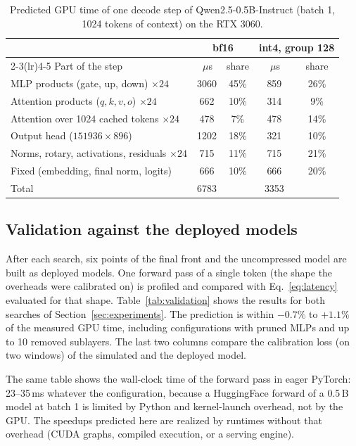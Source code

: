 \documentclass[11pt]{article}
\newcommand{\us}{\,$\mu$s}
\begin{document}
\begin{table}[htbp]
\centering
\small
\begin{tabular}{lcccc}
\toprule
& \multicolumn{2}{c}{bf16} & \multicolumn{2}{c}{int4, group 128} \\
\cmidrule(lr){2-3}\cmidrule(lr){4-5}
Part of the step & \us & share & \us & share \\
\midrule
MLP products (gate, up, down) $\times24$          & 3060 & 45\% & 859  & 26\% \\
Attention products ($q,k,v,o$) $\times24$          & 662  & 10\% & 314  & 9\% \\
Attention over 1024 cached tokens $\times24$       & 478  & 7\%  & 478  & 14\% \\
Output head ($151936\times896$)                    & 1202 & 18\% & 321  & 10\% \\
Norms, rotary, activations, residuals $\times24$   & 715  & 11\% & 715  & 21\% \\
Fixed (embedding, final norm, logits)              & 666  & 10\% & 666  & 20\% \\
\midrule
Total                                              & 6783 &      & 3353 &      \\
\bottomrule
\end{tabular}
\caption{Predicted GPU time of one decode step of Qwen2.5-0.5B-Instruct (batch 1, 1024 tokens of
context) on the RTX 3060.}
\label{tab:anatomy}
\end{table}

\subsection{Validation against the deployed models}
After each search, six points of the final front and the uncompressed model are built as deployed
models. One forward pass of a single token (the shape the overheads were calibrated on) is profiled
and compared with Eq.~\eqref{eq:latency} evaluated for that shape.
Table~\ref{tab:validation} shows the results for both searches of Section~\ref{sec:experiments}. The
prediction is within $-0.7\%$ to $+1.1\%$ of the measured GPU time, including configurations with
pruned MLPs and up to 10 removed sublayers. The last two columns compare the calibration loss (on two
windows) of the simulated and the deployed model.

The same table shows the wall-clock time of the forward pass in eager PyTorch: 23--35\,ms whatever the
configuration, because a HuggingFace forward of a 0.5\,B model at batch 1 is limited by Python and
kernel-launch overhead, not by the GPU. The speedups predicted here are realized by runtimes without
that overhead (CUDA graphs, compiled execution, or a serving engine).
\end{document}
